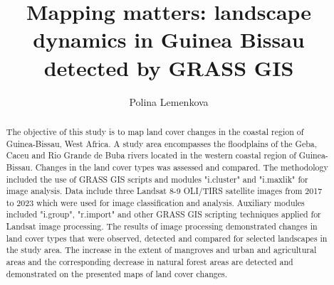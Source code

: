 \documentclass[final,5p,times,twocolumn]{elsarticle}
\begin{document}
\linenumbers
\setcounter{equation}{0}

\begin{frontmatter}



\title{Mapping matters: landscape dynamics in Guinea Bissau detected by GRASS GIS}

\author{Polina Lemenkova}


\begin{abstract}
The objective of this study is to map land cover changes in the coastal region of Guinea-Bissau, West Africa. A study area encompasses the floodplains of the Geba, Caceu and Rio Grande de Buba rivers located in the western coastal region of Guinea-Bissau. Changes in the land cover types was assessed and compared. The methodology included the use of GRASS GIS scripts and modules "i.cluster" and "i.maxlik" for image analysis. Data include three Landsat 8-9 OLI/TIRS satellite images from 2017 to 2023 which were used for image classification and analysis. Auxiliary modules included "i.group", "r.import" and other GRASS GIS scripting techniques applied for Landsat image processing. The results of image processing demonstrated changes in land cover types that were observed, detected and compared for selected landscapes in the study area. The increase in the extent of mangroves and urban and agricultural areas and the corresponding decrease in natural forest areas are detected and demonstrated on the presented maps of land cover changes.
\end{abstract}


\end{frontmatter}
\end{document}
